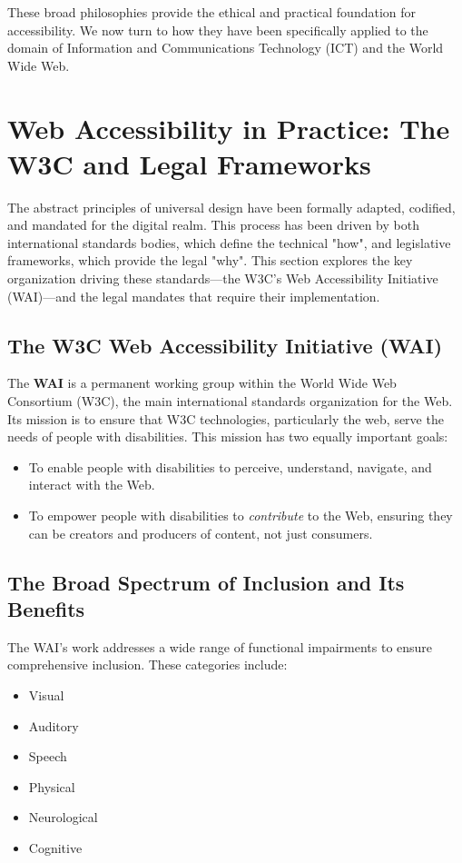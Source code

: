 \documentclass{scrbook}
\begin{document}
These broad philosophies provide the ethical and practical foundation for accessibility. We now turn to how they have been specifically applied to the domain of Information and Communications Technology (ICT) and the World Wide Web.

\chapter{Web Accessibility in Practice: The W3C and Legal Frameworks}

The abstract principles of universal design have been formally adapted, codified, and mandated for the digital realm. This process has been driven by both international standards bodies, which define the technical "how", and legislative frameworks, which provide the legal "why". This section explores the key organization driving these standards—the W3C's Web Accessibility Initiative (WAI)—and the legal mandates that require their implementation.

\section{The W3C Web Accessibility Initiative (WAI)}

The \textbf{WAI} is a permanent working group within the World Wide Web Consortium (W3C), the main international standards organization for the Web. Its mission is to ensure that W3C technologies, particularly the web, serve the needs of people with disabilities. This mission has two equally important goals:

\begin{itemize}
    \item To enable people with disabilities to perceive, understand, navigate, and interact with the Web.
    \item To empower people with disabilities to \textit{contribute} to the Web, ensuring they can be creators and producers of content, not just consumers.
\end{itemize}

\section{The Broad Spectrum of Inclusion and Its Benefits}

The WAI's work addresses a wide range of functional impairments to ensure comprehensive inclusion. These categories include:

\begin{itemize}
    \item Visual
    \item Auditory
    \item Speech
    \item Physical
    \item Neurological
    \item Cognitive
\end{itemize}
\end{document}
